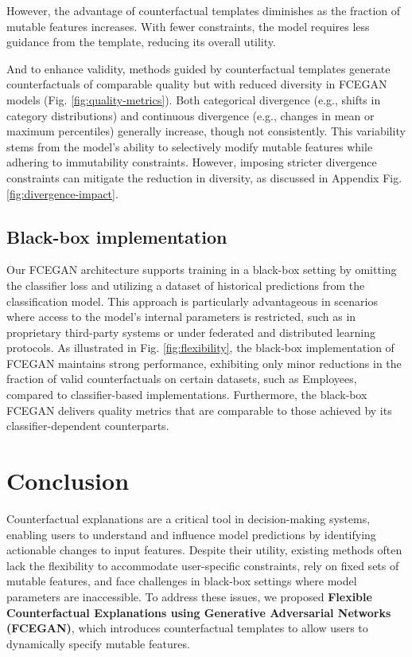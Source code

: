 \documentclass[runningheads]{llncs}
\begin{document}
However, the advantage of counterfactual templates diminishes as the fraction of mutable features increases. With fewer constraints, the model requires less guidance from the template, reducing its overall utility.

And to enhance validity, methods guided by counterfactual templates generate counterfactuals of comparable quality but with reduced diversity in FCEGAN models (Fig. \ref{fig:quality-metrics}). Both categorical divergence (e.g., shifts in category distributions) and continuous divergence (e.g., changes in mean or maximum percentiles) generally increase, though not consistently. This variability stems from the model's ability to selectively modify mutable features while adhering to immutability constraints. However, imposing stricter divergence constraints can mitigate the reduction in diversity, as discussed in Appendix Fig.  \ref{fig:divergence-impact}.

\subsection{Black-box implementation}

Our FCEGAN architecture supports training in a black-box setting by omitting the classifier loss and utilizing a dataset of historical predictions from the classification model. This approach is particularly advantageous in scenarios where access to the model's internal parameters is restricted, such as in proprietary third-party systems or under federated and distributed learning protocols. As illustrated in Fig. \ref{fig:flexibility}, the black-box implementation of FCEGAN maintains strong performance, exhibiting only minor reductions in the fraction of valid counterfactuals on certain datasets, such as Employees, compared to classifier-based implementations. Furthermore, the black-box FCEGAN delivers quality metrics that are comparable to those achieved by its classifier-dependent counterparts.

\section{Conclusion}
\label{sec:conclusion}

Counterfactual explanations are a critical tool in decision-making systems, enabling users to understand and influence model predictions by identifying actionable changes to input features. Despite their utility, existing methods often lack the flexibility to accommodate user-specific constraints, rely on fixed sets of mutable features, and face challenges in black-box settings where model parameters are inaccessible. To address these issues, we proposed \textbf{Flexible Counterfactual Explanations using Generative Adversarial Networks (FCEGAN)}, which introduces counterfactual templates to allow users to dynamically specify mutable features. 
\end{document}
